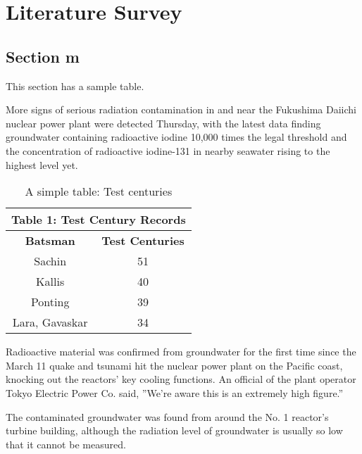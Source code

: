 %

\chapter{Literature Survey}
\section{Section m}
This section has a sample table. 


More signs of serious radiation contamination in and near the Fukushima Daiichi nuclear power plant were detected Thursday, with the latest data finding groundwater containing radioactive iodine 10,000 times the legal threshold and the concentration of radioactive iodine-131 in nearby seawater rising to the highest level yet.


\begin{table}[H]		%
\begin{center}		
\begin{tabular}{ | c | c | }	%
\hline
\multicolumn{2}{|c|}{Table 1: Test Century Records }\\
\hline
\bf{Batsman} & \bf{Test Centuries}\\ \hline
Sachin & 51 \\ \hline
Kallis & 40 \\ \hline
Ponting & 39 \\ \hline
Lara, Gavaskar & 34\\ 
\hline
\end{tabular}
\caption{A simple table: Test centuries}	%
\label{table1}
\end{center}
\end{table}

Radioactive material was confirmed from groundwater for the first time since the March 11 quake and tsunami hit the nuclear power plant on the Pacific coast, knocking out the reactors' key cooling functions. An official of the plant operator Tokyo Electric Power Co. said, ''We're aware this is an extremely high figure.''

The contaminated groundwater was found from around the No. 1 reactor's turbine building, although the radiation level of groundwater is usually so low that it cannot be measured.

